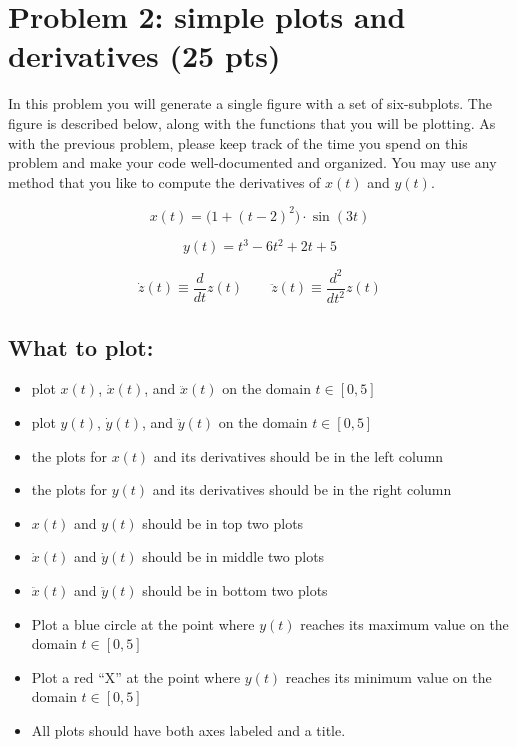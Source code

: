 \section*{Problem 2: simple plots and derivatives (25 pts)}

In this problem you will generate a single figure with a set of six-subplots.
The figure is described below, along with the functions that you will be plotting.
As with the previous problem, please keep track of the time you spend on this problem
and make your code well-documented and organized.
You may use any method that you like to compute the derivatives of $x(t)$ and $y(t)$.

\begin{equation}
x(t) = \big(1 + (t-2)^2 \big) \cdot \sin(3 t)
\end{equation}

\begin{equation}
y(t) = t^3 - 6 t^2 + 2 t + 5
\end{equation}

\begin{equation}
  \dot{z}(t) \equiv \frac{d}{dt} z(t)
  \quad \quad
  \ddot{z}(t) \equiv \frac{d^2}{dt^2} z(t)
\end{equation}

\subsection*{What to plot:}

\vspace{-0.6em} \begin{itemize}  \setlength\itemsep{0em} \setlength\itemindent{18pt}
\item plot $x(t)$, $\dot{x}(t)$, and $\ddot{x}(t)$ on the domain $t \in [0,5]$
\item plot $y(t)$, $\dot{y}(t)$, and $\ddot{y}(t)$ on the domain $t \in [0,5]$
\item the plots for $x(t)$ and its derivatives should be in the left column
\item the plots for $y(t)$ and its derivatives should be in the right column
\item $x(t)$ and $y(t)$ should be in top two plots
\item $\dot{x}(t)$ and $\dot{y}(t)$ should be in middle two plots
\item $\ddot{x}(t)$ and $\ddot{y}(t)$ should be in bottom two plots
\item Plot a blue circle at the point where $y(t)$ reaches its maximum value on the domain $t \in [0,5]$
\item Plot a red ``X'' at the point where $y(t)$ reaches its minimum value on the domain $t \in [0,5]$
\item All plots should have both axes labeled and a title.
\end{itemize}

